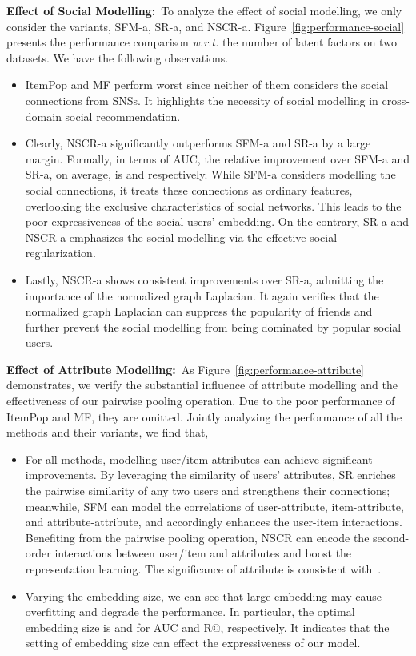 \documentclass[sigconf]{acmart}
\newcommand{\wrt}{\emph{w.r.t. }}
\begin{document}
	\textbf{Effect of Social Modelling:}~To analyze the effect of social modelling, we only consider the variants, SFM-a, SR-a, and NSCR-a. Figure~\ref{fig:performance-social} presents the performance comparison \wrt the number of latent factors on two datasets. We have the following observations.
	\begin{itemize}[leftmargin=*]
		\item ItemPop and MF perform worst since neither of them considers the social connections from SNSs. It highlights the necessity of social modelling in cross-domain social recommendation.
		\item Clearly, NSCR-a significantly outperforms SFM-a and SR-a by a large margin. Formally, in terms of AUC, the relative improvement over SFM-a and SR-a, on average, is  and  respectively. While SFM-a considers modelling the social connections, it treats these connections as ordinary features, overlooking the exclusive characteristics of social networks. This leads to the poor expressiveness of the social users' embedding. On the contrary, SR-a and NSCR-a emphasizes the social modelling via the effective social regularization.
		\item Lastly, NSCR-a shows consistent improvements over SR-a, admitting the importance of the normalized graph Laplacian. It again verifies that the normalized graph Laplacian can suppress the popularity of friends and further prevent the social modelling from being dominated by popular social users.
	\end{itemize}
	
	\textbf{Effect of Attribute Modelling:}~As Figure~\ref{fig:performance-attribute} demonstrates, we verify the substantial influence of attribute modelling and the effectiveness of our pairwise pooling operation. Due to the poor performance of ItemPop and MF, they are omitted. Jointly analyzing the performance of all the methods and their variants, we find that,
	\begin{itemize}[leftmargin=*]
		\item For all methods, modelling user/item attributes can achieve significant improvements. By leveraging the similarity of users' attributes, SR enriches the pairwise similarity of any two users and strengthens their connections; meanwhile, SFM can model the correlations of user-attribute, item-attribute, and attribute-attribute, and accordingly enhances the user-item interactions. Benefiting from the pairwise pooling operation, NSCR can encode the second-order interactions between user/item and attributes and boost the representation learning. The significance of attribute is consistent with~\cite{DBLP:conf/mm/ZhangZYYGC13}.
		\item Varying the embedding size, we can see that large embedding may cause overfitting and degrade the performance. In particular, the optimal embedding size is  and  for AUC and R@, respectively. It indicates that the setting of embedding size can effect the expressiveness of our model.
	\end{itemize}
	
\end{document}
